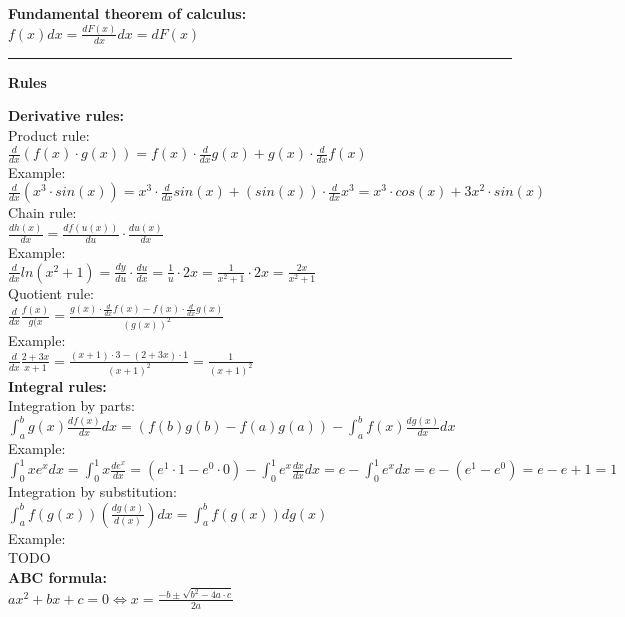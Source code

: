 \documentclass[12pt,a4paper]{report}
\begin{document}
	\textbf{Fundamental theorem of calculus:}\\
	$f(x)dx = \frac{dF(x)}{dx}dx = dF(x)$

	\rule{17cm}{1pt}

	\begin{center}\textbf{Rules}\end{center}
	
	\textbf{Derivative rules:}\\
	Product rule:\\
	$\frac{d}{dx}(f(x) \cdot g(x)) = f(x) \cdot \frac{d}{dx}g(x) + g(x) \cdot \frac{d}{dx}f(x)$\\
	Example:\\
	$\frac{d}{dx}(x^3 \cdot sin(x)) = x^3 \cdot \frac{d}{dx} sin(x) + (sin (x)) \cdot \frac{d}{dx} x^3 = x^3 \cdot cos(x) + 3x^2 \cdot sin(x)$\\
	Chain rule:\\
	$\frac{dh(x)}{dx} = \frac{df(u(x))}{du} \cdot \frac{du(x)}{dx}$\\
	Example:\\
	$\frac{d}{dx} ln(x^2 + 1) = \frac{dy}{du} \cdot \frac{du}{dx} = \frac{1}{u} \cdot 2x = \frac{1}{x^2 +1} \cdot 2x = \frac{2x}{x^2 + 1}$\\
	Quotient rule:\\
	$\frac{d}{dx}\frac{f(x)}{g(x} = \frac{g(x) \cdot \frac{d}{dx} f(x) - f(x) \cdot \frac{d}{dx}g(x)}{(g(x))^2}$\\
	Example:\\
	$\frac{d}{dx}\frac{2+3x}{x+1} = \frac{(x+1)\cdot3-(2+3x)\cdot1}{(x+1)^2} = \frac{1}{(x+1)^2}$\\
	
	\textbf{Integral rules:}\\
	Integration by parts:\\
	$\int_{a}^{b} g(x) \frac{df(x)}{dx} dx = (f(b)g(b) - f(a)g(a)) - \int_{a}^{b} f(x) \frac{dg(x)}{dx}dx$\\
	Example:\\
	$\int_{0}^{1} xe^x dx = \int_{0}^{1} x \frac{d e^x}{dx} = (e^1 \cdot 1 - e^0 \cdot 0) - \int_{0}^{1} e^x \frac{dx}{dx}dx = e - \int_{0}^{1} e^x dx = e - (e^1 - e^0) = e - e+1 = 1$\\
	Integration by substitution:\\
	$\int_{a}^{b} f(g(x)) (\frac{dg(x)}{d(x)}) dx = \int_{a}^{b} f(g(x)) dg(x)$\\
	Example:\\
	TODO\\
	\textbf{ABC formula:}\\
	$ax^2 + bx + c = 0 \iff x = \frac{-b \pm \sqrt{b^2 - 4a \cdot c}}{2a}$\\
	
\end{document}
